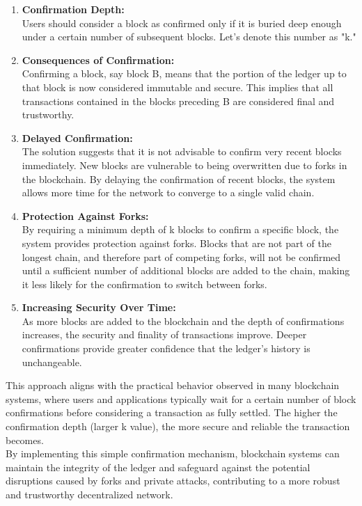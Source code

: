 \documentclass{report}
\begin{document}
\begin{enumerate}
	\item \textbf{Confirmation Depth:} \\Users should consider a block as confirmed only if it is buried deep enough under a certain number of subsequent blocks. Let's denote this number as "k."
	\item \textbf{Consequences of Confirmation:}\\Confirming a block, say block B, means that the portion of the ledger up to that block is now considered immutable and secure. This implies that all transactions contained in the blocks preceding B are considered final and trustworthy.
	\item \textbf{Delayed Confirmation:}\\The solution suggests that it is not advisable to confirm very recent blocks immediately. New blocks are vulnerable to being overwritten due to forks in the blockchain. By delaying the confirmation of recent blocks, the system allows more time for the network to converge to a single valid chain.
	\item \textbf{Protection Against Forks:}\\By requiring a minimum depth of k blocks to confirm a specific block, the system provides protection against forks. Blocks that are not part of the longest chain, and therefore part of competing forks, will not be confirmed until a sufficient number of additional blocks are added to the chain, making it less likely for the confirmation to switch between forks.
	\item \textbf{Increasing Security Over Time:}\\As more blocks are added to the blockchain and the depth of confirmations increases, the security and finality of transactions improve. Deeper confirmations provide greater confidence that the ledger's history is unchangeable.
\end{enumerate}
This approach aligns with the practical behavior observed in many blockchain systems, where users and applications typically wait for a certain number of block confirmations before considering a transaction as fully settled. The higher the confirmation depth (larger k value), the more secure and reliable the transaction becomes.\\
By implementing this simple confirmation mechanism, blockchain systems can maintain the integrity of the ledger and safeguard against the potential disruptions caused by forks and private attacks, contributing to a more robust and trustworthy decentralized network.\\
\end{document}
